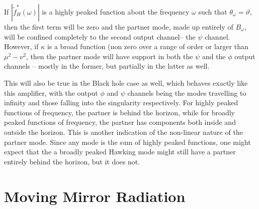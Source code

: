 \documentclass[aps,prd,showpacs,amssymb,nofootinbib,twocolumn]{revtex4}
\begin{document}
If $|\tilde f_H^*(\omega)|$ is a highly peaked function about the frequency 
$\omega$ such that $\theta_\omega=\vartheta$, then the first
term will be zero and the partner mode, made up entirely of $B_\omega$, will be
confined completely to the second output channel-- the $\psi$ channel.
However, if $\kappa$ is a broad function 
(non zero over a range of order or  larger than
$\mu^2-\nu^2$, then the partner mode will have support in both the $\psi$ and
the $\phi$ output channels -- mostly in the former, but partially in the latter
as well. 

This will also be true in the Black hole case as well, which behaves exactly
like this amplifier, with the output $\phi$ and $\psi$ channels being the
modes travelling to infinity and those falling into the singularity
respectively. For highly peaked functions of frequency, the partner is behind
the horizon, while for broadly peaked functions of frequency, the partner has
components both inside and outside the horizon. This is another indication of
the non-linear nature of the partner mode. Since any mode is the sum of highly
peaked functions, one might expect that the a broadly peaked Hawking mode
might still have a partner entirely behind the horizon, but it does not. 


\section{Moving Mirror Radiation}\label{Moving Mirror Radiation}
\end{document}

